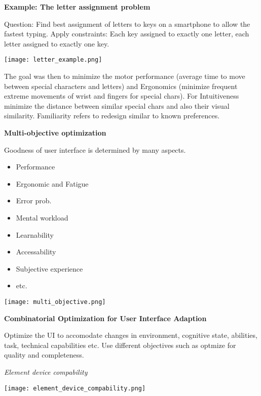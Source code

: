 \textbf{Example: The letter assignment problem} \smallskip

Question: Find best assignment of letters to keys on a smartphone to allow the fastest typing. 
Apply constraints: Each key assigned to exactly one letter, each letter assigned to exactly one key. 


\begin{center}
	\texttt{[image: letter\_example.png]}
\end{center}

The goal was then to minimize the motor performance (average time to move between special characters and letters) and Ergonomics (minimize frequent extreme movements of wrist and fingers for special chars).
For Intuitiveness minimize the distance between similar special chars and also their visual similarity. Familiarity refers to redesign similar to known preferences. \medskip

\textbf{Multi-objective optimization} \smallskip

Goodness of user interface is determined by many aspects. 

\begin{itemize}[itemsep=-5pt, topsep=0pt, leftmargin=*]
	\item Performance
	\item Ergonomic and Fatigue
	\item Error prob.
	\item Mental workload
	\item Learnability
	\item Accessability
	\item Subjective experience
	\item etc. 
\end{itemize}


\begin{center}
	\texttt{[image: multi\_objective.png]}
\end{center}

\textbf{Combinatorial Optimization for User Interface Adaption} \smallskip

Optimize the UI to accomodate changes in environment, cognitive state, abilities, task, technical capabilities etc. Use different objectives such as optmize for quality and completeness. \smallskip

\textit{Element device compability}

\begin{center}
	\texttt{[image: element\_device\_compability.png]}
\end{center}

